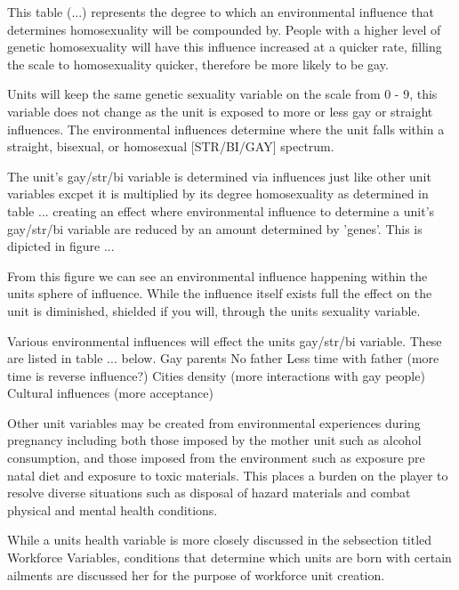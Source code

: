 This table (...) represents the degree to which an environmental influence that determines homosexuality will be compounded by. People with a higher level of genetic homosexuality will have this influence increased at a quicker rate, filling the scale to homosexuality quicker, therefore be more likely to be gay.

Units will keep the same genetic sexuality variable on the scale from 0 - 9, this variable does not change as the unit is exposed to more or less gay or straight influences. The environmental influences determine where the unit falls within a straight, bisexual, or homosexual [STR/BI/GAY] spectrum.

The unit's gay/str/bi variable is determined via influences just like other unit variables excpet it is multiplied by its degree homosexuality as determined in table ... creating an effect where environmental influence to determine a unit's gay/str/bi variable are reduced by an amount determined by 'genes'. This is dipicted in figure ...


From this figure we can see an environmental influence happening within the units sphere of influence. While the influence itself exists full the effect on the unit is diminished, shielded if you will, through the units sexuality variable. 

Various environmental influences will effect the units gay/str/bi variable. These are listed in table ... below.
Gay parents
No father
Less time with father (more time is reverse influence?)
Cities density (more interactions with gay people)
Cultural influences (more acceptance)




Other unit variables may be created from environmental experiences during pregnancy including both those imposed by the mother unit such as alcohol consumption, and those imposed from the environment such as exposure pre natal diet and exposure to toxic materials. This places a burden on the player to resolve diverse situations such as disposal of hazard materials and combat physical and mental health conditions.

While a units health variable is more closely discussed in the sebsection titled Workforce Variables, conditions that determine which units are born with certain ailments are discussed her for the purpose of workforce unit creation.

